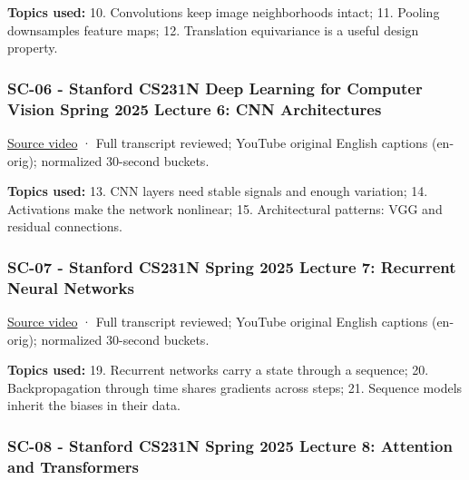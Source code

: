 \textbf{Topics used:} 10. Convolutions keep image neighborhoods intact; 11. Pooling downsamples feature maps; 12. Translation equivariance is a useful design property.

\subsubsection{SC-06 - Stanford CS231N Deep Learning for Computer Vision Spring 2025 Lecture 6: CNN Architectures}\label{04-visual-computing-ii-ch036-sc-06---stanford-cs231n-deep-learning-for-computer-vision-spring-2025-lecture-6-cnn-architectures}

\hypertarget{04-visual-computing-ii-ch036-sc-06---stanford-cs231n-deep-learning-for-computer-vision-spring-2025-lecture-6-cnn-architectures}{}

\href{https://www.youtube.com/watch?v=aVJy4O5TOk8}{Source video} · Full transcript reviewed; YouTube original English captions (en-orig); normalized 30-second buckets.

\textbf{Topics used:} 13. CNN layers need stable signals and enough variation; 14. Activations make the network nonlinear; 15. Architectural patterns: VGG and residual connections.

\subsubsection{SC-07 - Stanford CS231N Spring 2025 Lecture 7: Recurrent Neural Networks}\label{04-visual-computing-ii-ch036-sc-07---stanford-cs231n-spring-2025-lecture-7-recurrent-neural-networks}

\hypertarget{04-visual-computing-ii-ch036-sc-07---stanford-cs231n-spring-2025-lecture-7-recurrent-neural-networks}{}

\href{https://www.youtube.com/watch?v=kG2lAPBF7zA}{Source video} · Full transcript reviewed; YouTube original English captions (en-orig); normalized 30-second buckets.

\textbf{Topics used:} 19. Recurrent networks carry a state through a sequence; 20. Backpropagation through time shares gradients across steps; 21. Sequence models inherit the biases in their data.

\subsubsection{SC-08 - Stanford CS231N Spring 2025 Lecture 8: Attention and Transformers}\label{04-visual-computing-ii-ch036-sc-08---stanford-cs231n-spring-2025-lecture-8-attention-and-transformers}

